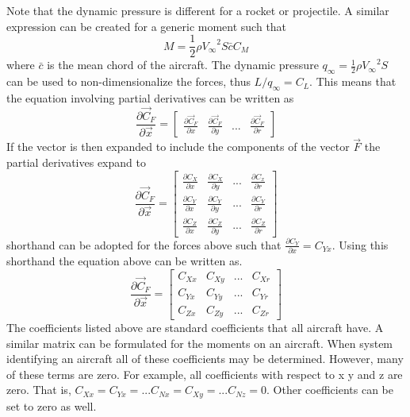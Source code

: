 \documentclass{article}
\begin{document}
Note that the dynamic pressure is different for
a rocket or projectile. A similar expression can be created for a
generic moment such that
\begin{equation}
M = \frac{1}2\rho {V_{\infty}}^2 S \bar{c} C_M
\end{equation}
where $\bar{c}$ is the mean chord of the aircraft. The dynamic pressure $q_{\infty} =
\frac{1}2\rho {V_{\infty}}^2 S$ can be used to non-dimensionalize the forces, thus $L/q_{\infty} = C_L$. This means
that the equation involving partial derivatives can be written as
\begin{equation}
\frac{\partial \vec{C}_F}{\partial \vec{x}} = \begin{bmatrix} \frac{\partial
    \vec{C}_F}{\partial x} & \frac{\partial \vec{C}_F}{\partial y} & ... &
  \frac{\partial \vec{C}_F}{\partial r} \end{bmatrix}
\end{equation}
If the vector is then expanded to include the components of the vector
$\vec{F}$ the partial derivatives expand to
\begin{equation}
\frac{\partial \vec{C}_F}{\partial \vec{x}} = \begin{bmatrix}
  \frac{\partial C_X}{\partial x} & \frac{\partial C_X}{\partial y} &
  ... & \frac{\partial C_x}{\partial r} \\ \frac{\partial C_Y}{\partial x} & \frac{\partial C_Y}{\partial y} &
  ... & \frac{\partial C_Y}{\partial r} \\ \frac{\partial C_Z}{\partial x} & \frac{\partial C_Z}{\partial y} &
  ... & \frac{\partial C_Z}{\partial r} \end{bmatrix}
\end{equation}
shorthand can be adopted for the forces above such that
$\frac{\partial C_Y}{\partial x} = C_{Yx}$. Using this shorthand the
equation above can be written as.
\begin{equation}
\frac{\partial \vec{C}_F}{\partial \vec{x}} = \begin{bmatrix}
  C_{Xx} & C_{Xy} &
  ... & C_{Xr} \\ C_{Yx} & C_{Yy} &
  ... & C_{Yr} \\ C_{Zx} & C_{Zy} &
  ... & C_{Zr} \end{bmatrix}
\end{equation}
The coefficients listed above are standard coefficients that all
aircraft have. A similar matrix can be formulated for the moments on
an aircraft. When system identifying an aircraft all of these
coefficients may be determined. However, many of these terms are
zero. For example, all coefficients with respect to x y and z are
zero. That is, $C_{Xx} = C_{Yx} = ... C_{Nx} = C_{Xy} = ... C_{Nz} =
0$. Other coefficients can be set to zero as well. 
\end{document}
